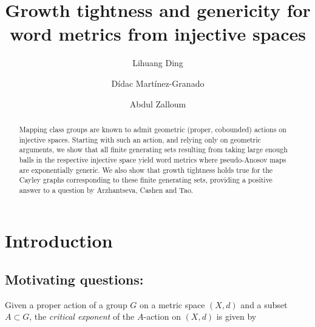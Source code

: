 \documentclass{amsart}
\author[Ding]{Lihuang Ding}
\author[Martínez-Granado]{Dídac Martínez-Granado}
\author[Zalloum]{Abdul Zalloum}
\numberwithin{thm}{section}
\numberwithin{figure}{section}
\theoremstyle{definition}
\theoremstyle{definition}
\theoremstyle{remark}
\numberwithin{equation}{section}
\DeclareMathOperator{\Cay}{\mathit{Cay}}
\DeclareMathOperator{\MCG}{\mathit{MCG}}
\newcommand{\DMGtodo}[2][]{\todo[color=orange!80,#1]{#2}}
\theoremstyle{plain}
\begin{document}
\title{Growth tightness and genericity for word metrics from injective spaces}



\begin{abstract} Mapping class groups are known to admit geometric (proper, cobounded) actions on injective spaces. Starting with such an action, and relying only on geometric arguments, we show that all finite generating sets resulting from taking large enough balls in the respective injective space yield word metrics where pseudo-Anosov maps are exponentially generic. We also show that growth tightness holds true for the Cayley graphs corresponding to these finite generating sets, providing a positive answer to a question by Arzhantseva, Cashen and Tao.
\end{abstract}
\maketitle







\section{Introduction}


\subsection{Motivating questions:} 
Given a proper action of a group $G$ on a metric space $(X,d)$ and a subset $A \subset G$, the \emph{critical exponent} of the $A$-action on $(X,d)$ is given by 
\end{document}
